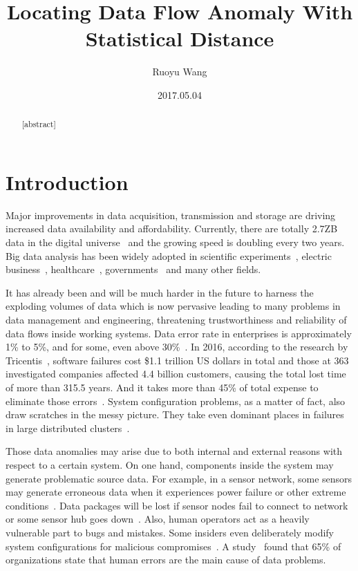 \documentclass[a4paper]{IEEEtran}
\title{Locating Data Flow Anomaly With Statistical Distance}
\author{Ruoyu Wang}
\date{2017.05.04}
\begin{document}
	\maketitle
	
	\begin{abstract}
		[abstract]
	\end{abstract}
	
	\section{Introduction}
		Major improvements in data acquisition, transmission and storage are driving increased data availability and affordability. Currently, there are totally 2.7ZB data in the digital universe~\autocite{bigDataStatistics} and the growing speed is doubling every two years.
		Big data analysis has been widely adopted in scientific experiments~\autocite{nothaft2015rethinking}, electric business~\autocite{bronson2015open,sumbaly2013big,chen2016realtime}, healthcare~\autocite{groves2016big}, governments~\autocite{kim2014big} and many other fields.
		
		It has already been and will be much harder in the future to harness the exploding volumes of data which is now pervasive leading to many problems in data management and engineering, threatening trustworthiness and reliability of data flows inside working systems.
		Data error rate in enterprises is approximately 1\% to 5\%, and for some, even above 30\%~\autocite{saha2014data}.
		In 2016, according to the research by Tricentis~\cite{softwareFailure}, software failures cost \$1.1 trillion US dollars in total and those at 363 investigated companies affected 4.4 billion customers, causing the total lost time of more than 315.5 years. And it takes more than 45\% of total expense to eliminate those errors~\cite{pawar2016software}. System configuration problems, as a matter of fact, also draw scratches in the messy picture. They take even dominant places in failures in large distributed clusters~\cite{xu2015systems}.
		
		Those data anomalies may arise due to both internal and external reasons with respect to a certain system. On one hand, components inside the system may generate problematic source data. For example, in a sensor network, some sensors may generate erroneous data when it experiences power failure or other extreme conditions~\autocite{rassam2014adaptive}. Data packages will be lost if sensor nodes fail to connect to network or some sensor hub goes down~\autocite{herodotou2014scalable}. Also, human operators act as a heavily vulnerable part to bugs and mistakes. Some insiders even deliberately modify system configurations for malicious compromises~\autocite{schuster2015vc3}. A study~\autocite{humanError} found that 65\% of organizations state that human errors are the main  cause of data problems.
		
\end{document}
